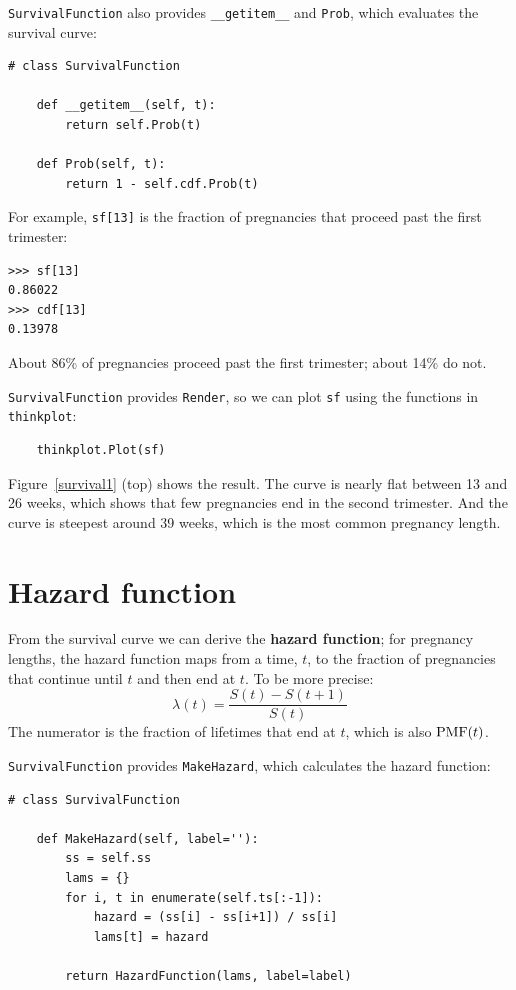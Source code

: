 \documentclass[12pt]{book}
\begin{document}
{\tt SurvivalFunction} also provides \verb"__getitem__" and
{\tt Prob}, which evaluates the survival curve:

\begin{verbatim}
# class SurvivalFunction

    def __getitem__(self, t):
        return self.Prob(t)

    def Prob(self, t):
        return 1 - self.cdf.Prob(t)
\end{verbatim}

For example, {\tt sf[13]} is the fraction of pregnancies that
proceed past the first trimester:

\begin{verbatim}
>>> sf[13]
0.86022
>>> cdf[13]
0.13978
\end{verbatim}

About 86\% of pregnancies proceed past the first trimester;
about 14\% do not.

{\tt SurvivalFunction} provides {\tt Render}, so we can
plot {\tt sf} using the functions in {\tt thinkplot}:

\begin{verbatim}
    thinkplot.Plot(sf)
\end{verbatim}

Figure~\ref{survival1} (top) shows the result.  The curve is nearly
flat between 13 and 26 weeks, which shows that few pregnancies
end in the second trimester.  And the curve is steepest around 39
weeks, which is the most common pregnancy length.


\section{Hazard function}
\label{hazard}

From the survival curve we can derive the {\bf hazard function};
for pregnancy lengths, the hazard function maps from a time, $t$, to
the fraction of pregnancies that continue until $t$ and then end at
$t$.  To be more precise:
%
\[ \lambda(t) = \frac{S(t) - S(t+1)}{S(t)} \]
%
The numerator is the fraction of lifetimes that end at $t$, which
is also $\mathrm{PMF}(t)$.

{\tt SurvivalFunction} provides {\tt MakeHazard}, which calculates
the hazard function:

\begin{verbatim}
# class SurvivalFunction

    def MakeHazard(self, label=''):
        ss = self.ss
        lams = {}
        for i, t in enumerate(self.ts[:-1]):
            hazard = (ss[i] - ss[i+1]) / ss[i]
            lams[t] = hazard

        return HazardFunction(lams, label=label)
\end{verbatim}
\end{document}

